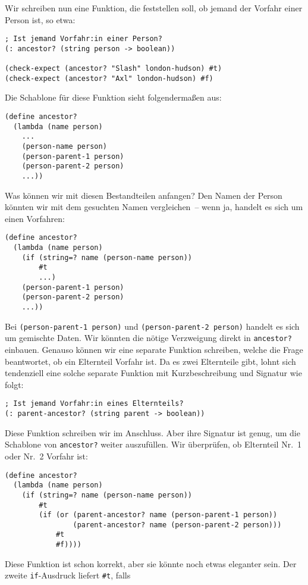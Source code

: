 %
Wir schreiben nun eine Funktion, die feststellen soll, ob jemand der
Vorfahr einer Person ist, so etwa:
%
\begin{lstlisting}
; Ist jemand Vorfahr:in einer Person?
(: ancestor? (string person -> boolean))

(check-expect (ancestor? "Slash" london-hudson) #t)
(check-expect (ancestor? "Axl" london-hudson) #f)
\end{lstlisting}
%
Die Schablone für diese Funktion sieht folgendermaßen aus:
%
\begin{lstlisting}
(define ancestor?
  (lambda (name person)
    ...
    (person-name person)
    (person-parent-1 person)
    (person-parent-2 person)
    ...))
\end{lstlisting}
%
Was können wir mit diesen Bestandteilen anfangen?  Den Namen der
Person könnten wir mit dem gesuchten Namen vergleichen~-- wenn ja,
handelt es sich um einen Vorfahren:
%
\begin{lstlisting}
(define ancestor?
  (lambda (name person)
    (if (string=? name (person-name person))
        #t
        ...)
    (person-parent-1 person)
    (person-parent-2 person)
    ...))
\end{lstlisting}
%
Bei \lstinline{(person-parent-1 person)} und
\lstinline{(person-parent-2 person)} handelt es sich um gemischte
Daten.  Wir könnten die nötige Verzweigung direkt in
\lstinline{ancestor?} einbauen.  Genauso können wir eine separate
Funktion schreiben, welche die Frage beantwortet, ob ein Elternteil
Vorfahr ist.  Da es zwei Elternteile gibt, lohnt sich tendenziell eine
solche separate Funktion mit Kurzbeschreibung und Signatur wie folgt:
%
\begin{lstlisting}
; Ist jemand Vorfahr:in eines Elternteils?
(: parent-ancestor? (string parent -> boolean))
\end{lstlisting}
%
Diese Funktion schreiben wir im Anschluss.  Aber ihre Signatur
ist genug, um die Schablone von \lstinline{ancestor?}
weiter auszufüllen.  Wir überprüfen, ob Elternteil Nr.~1 oder Nr.~2
Vorfahr ist:
%
\begin{lstlisting}
(define ancestor?
  (lambda (name person)
    (if (string=? name (person-name person))
        #t
        (if (or (parent-ancestor? name (person-parent-1 person))
                (parent-ancestor? name (person-parent-2 person)))
            #t
            #f))))
\end{lstlisting}
%
Diese Funktion ist schon korrekt, aber sie könnte noch etwas eleganter
sein.  Der zweite \lstinline{if}-Ausdruck liefert \lstinline{#t}, falls
